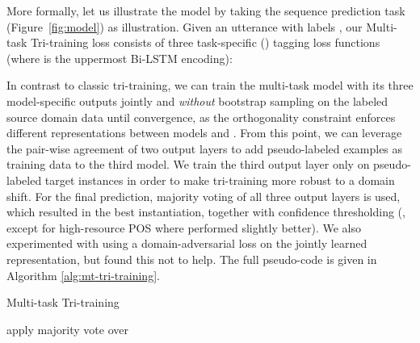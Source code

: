 \documentclass[11pt,a4paper]{article}
\begin{document}
More formally, let us illustrate the model by taking the sequence prediction task (Figure~\ref{fig:model}) as illustration. Given an utterance with labels , our Multi-task Tri-training loss consists of three task-specific () tagging loss functions (where  is the uppermost Bi-LSTM encoding): 

In contrast to classic tri-training, we can train the multi-task model with its three model-specific outputs jointly and \textit{without} bootstrap sampling on the labeled source domain data until convergence, as the orthogonality constraint enforces different representations between models  and . From this point, we can leverage the pair-wise agreement of two output layers to add pseudo-labeled examples as training data to the third model. We train the third output layer  only on pseudo-labeled target instances in order to make tri-training more robust to a domain shift. For the final prediction, majority voting of all three output layers is used, which resulted in the best instantiation, together with confidence thresholding  (, except for high-resource POS where  performed slightly better). We also experimented with using a domain-adversarial loss \cite{Ganin2016} on the jointly learned representation, but found this not to help. The full pseudo-code is given in Algorithm \ref{alg:mt-tri-training}. 

\begin{algorithm}[t!]
\caption{Multi-task Tri-training}\label{alg:mt-tri-training}
\begin{algorithmic}[1]
\State 
\Repeat
	\For {}
        \State 
		\For {}
            \If {}
            	\State 
            \EndIf
        \EndFor
        \If {}
        	
        \Else
        	{}
        \EndIf
        
	\EndFor
{}
\State apply majority vote over 
\end{algorithmic}
\end{algorithm}
\end{document}
